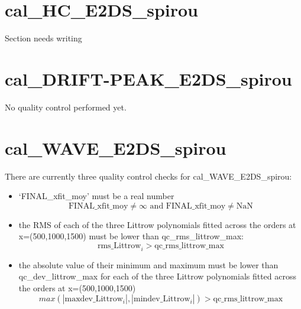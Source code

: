 \section{cal\_HC\_E2DS\_spirou}
\label{section:qc_cal_HC_E2DS_spirou}


Section needs writing



\section{cal\_DRIFT-PEAK\_E2DS\_spirou}
\label{section:qc_cal_DRIFT-PEAK_E2DS}


No quality control performed yet.


\section{cal\_WAVE\_E2DS\_spirou}
\label{section:qc_cal_WAVE_E2DS_spirou}

There are currently three quality control checks for cal\_WAVE\_E2DS\_spirou:

\begin{itemize}
\item `FINAL\_xfit\_moy' must be a real number
	\begin{equation}
	\text{FINAL\_xfit\_moy} \neq \infty \text{ and }
	\text{FINAL\_xfit\_moy} \neq \text{NaN}
	\end{equation}
\item the RMS of each of the three Littrow polynomials fitted across the orders at x=(500,1000,1500) must be lower than qc\_rms\_littrow\_max: 
	\begin{equation}
	\text{rms\_Littrow}_i > \text{qc\_rms\_littrow\_max}
	\end{equation}
\item the absolute value of their minimum and maximum must be lower than qc\_dev\_littrow\_max for each of the three Littrow polynomials fitted across the orders at x=(500,1000,1500)
	\begin{equation}
	max(|\text{maxdev\_Littrow}_i|, |\text{mindev\_Littrow}_i|) > \text{qc\_rms\_littrow\_max}
	\end{equation}
\end{itemize}

